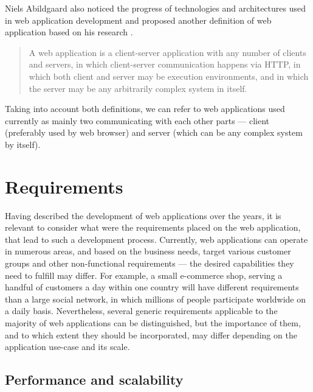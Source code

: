 Niels Abildgaard also noticed the progress of technologies and architectures used in web application development and proposed another definition of web application based on his research \cite{PerspectivesOnArchitectureEvolution}.

\begin{quotation}
A web application is a client-server application with any number of clients and servers, in which client-server communication happens via HTTP, in which both client and server may be execution environments, and in which the server may be any arbitrarily complex system in itself.
\end{quotation}

Taking into account both definitions, we can refer to web applications used currently as mainly two communicating with each other parts --- client (preferably used by web browser) and server (which can be any complex system by itself).

\section{Requirements} \label{chapter:web-apps-requirements}

Having described the development of web applications over the years, it is relevant to consider what were the requirements placed on the web application, that lead to such a development process. Currently, web applications can operate in numerous areas, and based on the business needs, target various customer groups and other non-functional requirements --- the desired capabilities they need to fulfill may differ. For example, a small e-commerce shop, serving a handful of customers a day within one country will have different requirements than a large social network, in which millions of people participate worldwide on a daily basis. Nevertheless, several generic requirements applicable to the majority of web applications can be distinguished, but the importance of them, and to which extent they should be incorporated, may differ depending on the application use-case and its scale.

\subsection{Performance and scalability}


